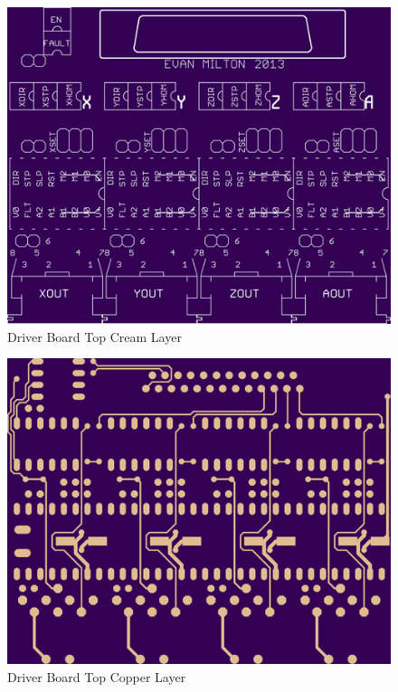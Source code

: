 \begin{figure}[h]
	\centering
	\includegraphics[width=1\textwidth]{pcb-design/dtopcream.png}
	\caption{Driver Board Top Cream Layer}
	\label{fig:driver-top-cream}
\end{figure}
\begin{figure}[h]
	\centering
	\includegraphics[width=1\textwidth]{pcb-design/dtoproute.png}
	\caption{Driver Board Top Copper Layer}
	\label{fig:driver-top-copper}
\end{figure}
